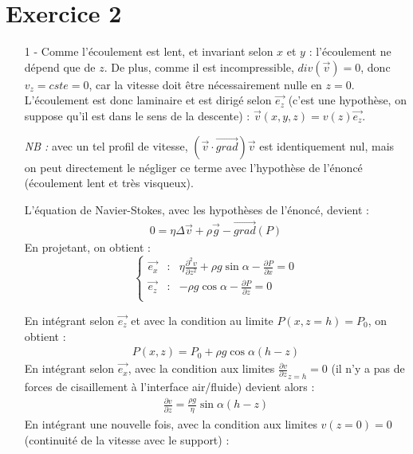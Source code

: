 \documentclass{report}
\begin{document}
\section*{Exercice 2}

\begin{itemize}
	\item[1 - ] Comme l'écoulement est lent, et invariant selon $x$ et $y$ : l'écoulement ne dépend que de $z$. De plus, comme il est incompressible, $div(\vec{v})=0$, donc $v_z=cste=0$, car la vitesse doit être nécessairement nulle en $z=0$. L'écoulement est donc laminaire et est dirigé selon $\vec{e_z}$ (c'est une hypothèse, on suppose qu'il est dans le sens de la descente) : $\vec{v}(x,y,z)=v(z)\vec{e_z}$.
	
	\textit{NB : }avec un tel profil de vitesse, $(\vec{v}\cdot\vec{grad})\vec{v}$ est identiquement nul, mais on peut directement le négliger ce terme avec l'hypothèse de l'énoncé (écoulement lent et très visqueux).
	
	L'équation de Navier-Stokes, avec les hypothèses de l'énoncé, devient : 
\begin{align*}
	0=\eta \Delta \vec{v}+\rho\vec{g}-\vec{grad}(P)
\end{align*}
	En projetant, on obtient : 
\begin{equation}
\left\lbrace
\begin{array}{ccc}
\vec{e_x}  & : & \eta\frac{\partial^2 v}{\partial z^2}+\rho g \sin\alpha - \frac{\partial P}{\partial x}=0\\
\vec{e_z}  & : &-\rho g \cos\alpha - \frac{\partial P}{\partial z}=0\\
\end{array}\right.
\end{equation}	

En intégrant selon $\vec{e_z}$ et avec la condition au limite $P(x,z=h)=P_0$, on obtient :
\begin{align*}
	P(x,z)=P_0+\rho g\cos\alpha (h-z)
\end{align*}
En intégrant selon $\vec{e_x}$, avec la condition aux limites $\frac{\partial v}{\partial z}_{z=h}=0$ (il n'y a pas de forces de cisaillement à l'interface air/fluide) devient alors : 
\begin{align*}
	\frac{\partial v}{\partial z}=\frac{\rho g}{\eta}\sin\alpha(h-z)
\end{align*}
En intégrant une nouvelle fois, avec la condition aux limites $v(z=0)=0$ (continuité  de la vitesse avec le support) :

\noindent{}


\end{itemize}
\end{document}
